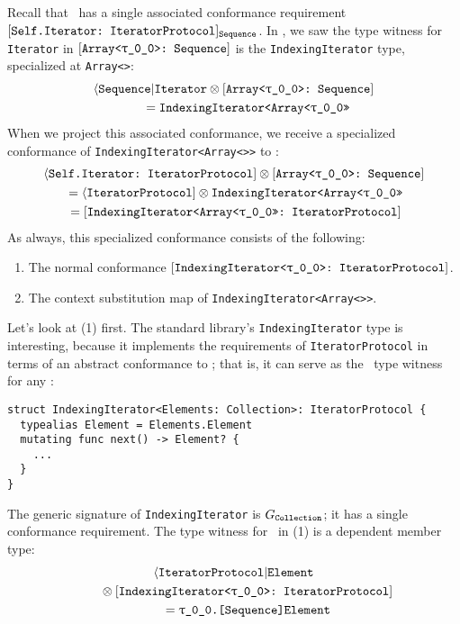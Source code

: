 \documentclass[../generics]{subfiles}
\begin{document}
\begin{example}\label{indexing iterator example}
Recall that \tSequence\ has a single associated conformance requirement $[\texttt{Self.Iterator:~IteratorProtocol}]_{\texttt{Sequence}}$. In , we saw the type witness for \texttt{Iterator} in $\ArraySequence$ is the \texttt{IndexingIterator} type, specialized at \texttt{Array<\rT>}:
\begin{gather*}
\AIterator \otimes \ArraySequence\\
\qquad {} = \texttt{IndexingIterator<Array<\rT>>}
\end{gather*}
When we project this associated conformance, we receive a specialized conformance of \texttt{IndexingIterator<Array<\rT>>} to \tIterator:
\begin{gather*}
\SelfIterator \otimes \ArraySequence\\
{} = \PIterator \otimes \texttt{IndexingIterator<Array<\rT>>}\\
{} = \ConfReq{IndexingIterator<Array<\rT>>}{IteratorProtocol}
\end{gather*}
As always, this specialized conformance consists of the following:
\begin{enumerate}
\item The normal conformance $\ConfReq{IndexingIterator<\rT>}{IteratorProtocol}$.
\item The context substitution map of \texttt{IndexingIterator<Array<\rT>>}.
\end{enumerate}
Let's look at (1) first. The standard library's \texttt{IndexingIterator} type is interesting, because it implements the requirements of \texttt{IteratorProtocol} in terms of an abstract conformance to \tCollection; that is, it can serve as the \nIterator\ type witness for any \tCollection:
\begin{Verbatim}
struct IndexingIterator<Elements: Collection>: IteratorProtocol {
  typealias Element = Elements.Element
  mutating func next() -> Element? {
    ...
  }
}
\end{Verbatim}
The generic signature of \texttt{IndexingIterator} is $G_{\texttt{Collection}}$; it has a single conformance requirement. The type witness for \nElement\ in (1) is a dependent member type:
\begin{gather*}
\AIElement \\
\qquad {} \otimes \ConfReq{IndexingIterator<\rT>}{IteratorProtocol} \\
\qquad {} = \texttt{\rT.[Sequence]Element}
\end{gather*}

\end{example}
\end{document}

